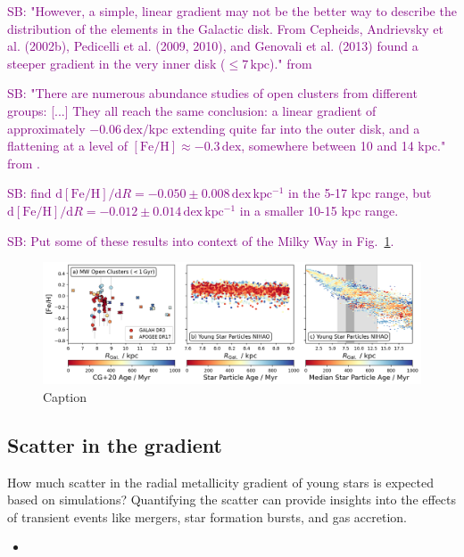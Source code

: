 \documentclass[fleqn,usenatbib]{mnras}
\newcommand{\SB}[1]{{\textcolor{purple}{SB: #1}}}
\begin{document}
\SB{"However, a simple, linear gradient may not be the better way to describe the distribution of the elements in the Galactic disk. From Cepheids, Andrievsky et al. (2002b), Pedicelli et al. (2009, 2010), and Genovali et al. (2013) found a steeper gradient in the very inner disk ($\leq 7\,\mathrm{kpc}$)." from \citet{Lemasle2013}}

\SB{"There are numerous abundance studies of open clusters from different groups: [...] They all reach the same conclusion: a linear gradient of approximately $-0.06\,\mathrm{dex/kpc}$ extending quite far into the outer disk, and a flattening at a level of $\mathrm{[Fe/H]} \approx -0.3\,\mathrm{dex}$, somewhere between 10 and 14 kpc." from \citet{Lemasle2013}.}

\SB{\citet{Lemasle2008} find $\mathrm{d[Fe/H]}/\mathrm{d}R = -0.050 \pm 0.008\,\mathrm{dex\,kpc^{-1}}$ in the 5-17 kpc range, but $\mathrm{d[Fe/H]}/\mathrm{d}R = -0.012 \pm 0.014\,\mathrm{dex\,kpc^{-1}}$ in a smaller 10-15 kpc range.}

\SB{Put some of these results into context of the Milky Way in Fig.~\ref{fig:radial_metallicity_gradients_mw_vs_nihao}.}

\begin{figure}
    \centering
    \includegraphics[width=\textwidth]{figures/radial_metallicity_gradients_mw_vs_nihao.png}
    \caption{Caption}
    \label{fig:radial_metallicity_gradients_mw_vs_nihao}
\end{figure}

\subsection{Scatter in the gradient} \label{sec:discussion_scatter}

How much scatter in the radial metallicity gradient of young stars is expected based on simulations? Quantifying the scatter can provide insights into the effects of transient events like mergers, star formation bursts, and gas accretion.

\begin{itemize}
    \item 
\end{itemize}
\end{document}
